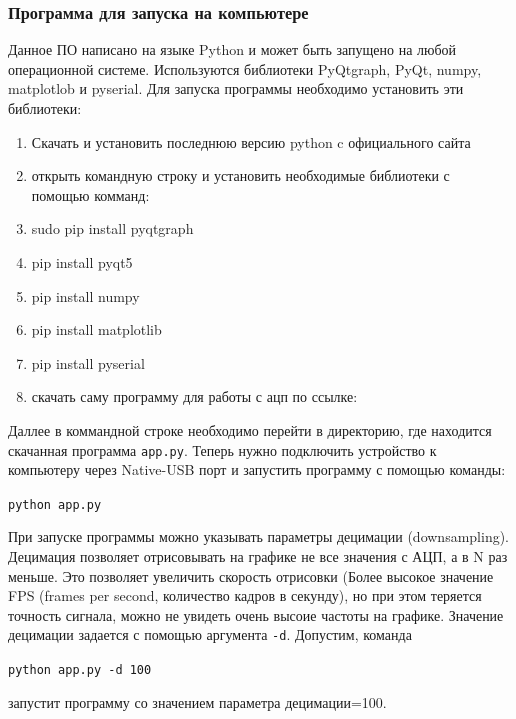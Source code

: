 \documentclass[../paper.tex]{subfiles}
\begin{document}
\subsubsection{Программа для запуска на компьютере}
Данное ПО написано на языке Python и может быть запущено на любой операционной системе. Используются библиотеки PyQtgraph, PyQt, numpy, matplotlob и pyserial. Для запуска программы необходимо установить эти библиотеки:
\begin{enumerate}
  \item Скачать и установить последнюю версию python c официального сайта\cite{python}
  \item открыть командную строку и установить необходимые библиотеки с помощью комманд:
  \item sudo pip install pyqtgraph
  \item pip install pyqt5
  \item pip install numpy
  \item pip install matplotlib
  \item pip install pyserial
  \item скачать саму программу для работы с ацп по ссылке: \cite{app}
\end{enumerate}

Даллее в коммандной строке необходимо перейти в директорию, где находится скачанная программа \lstinline|app.py|. Теперь нужно подключить устройство к компьютеру через Native-USB порт и запустить программу с помощью команды:

\lstinline|python app.py|

При запуске программы можно указывать параметры децимации (downsampling). Децимация позволяет отрисовывать на графике не все значения с АЦП, а в N раз меньше. Это позволяет увеличить скорость отрисовки (Более высокое значение FPS (frames per second, количество кадров в секунду), но при этом теряется точность сигнала, можно не увидеть очень высоие частоты на графике. Значение децимации задается с помощью аргумента \lstinline|-d|. Допустим, команда

\lstinline|python app.py -d 100|

запустит программу со значением параметра децимации=100.
\end{document}
